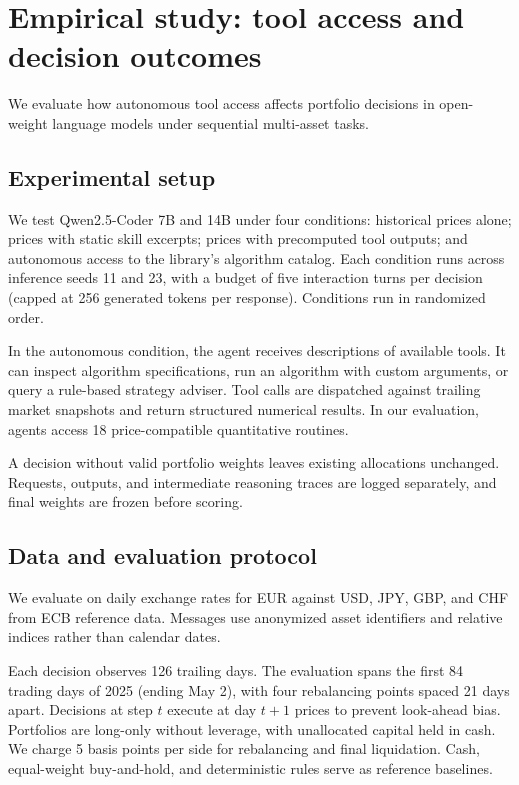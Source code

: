 \section{Empirical study: tool access and decision outcomes}
\label{sec:autonomous}
We evaluate how autonomous tool access affects portfolio decisions in open-weight
language models under sequential multi-asset tasks.

\subsection{Experimental setup}
We test Qwen2.5-Coder 7B and 14B under four conditions: historical prices alone; prices
with static skill excerpts; prices with precomputed tool outputs; and autonomous access
to the library's algorithm catalog. Each condition runs across inference seeds 11 and 23,
with a budget of five interaction turns per decision (capped at 256 generated tokens per
response). Conditions run in randomized order.

In the autonomous condition, the agent receives descriptions of available tools. It can
inspect algorithm specifications, run an algorithm with custom arguments, or query a
rule-based strategy adviser. Tool calls are dispatched against trailing market snapshots
and return structured numerical results. In our evaluation, agents access 18
price-compatible quantitative routines.

A decision without valid portfolio weights leaves existing allocations unchanged.
Requests, outputs, and intermediate reasoning traces are logged separately, and final
weights are frozen before scoring.

\subsection{Data and evaluation protocol}
We evaluate on daily exchange rates for EUR against USD, JPY, GBP, and CHF from ECB
reference data. Messages use anonymized asset identifiers and relative indices rather
than calendar dates.

Each decision observes 126 trailing days. The evaluation spans the first 84 trading days
of 2025 (ending May 2), with four rebalancing points spaced 21 days apart. Decisions at
step $t$ execute at day $t+1$ prices to prevent look-ahead bias. Portfolios are long-only
without leverage, with unallocated capital held in cash. We charge 5 basis points per
side for rebalancing and final liquidation. Cash, equal-weight buy-and-hold, and
deterministic rules serve as reference baselines.

